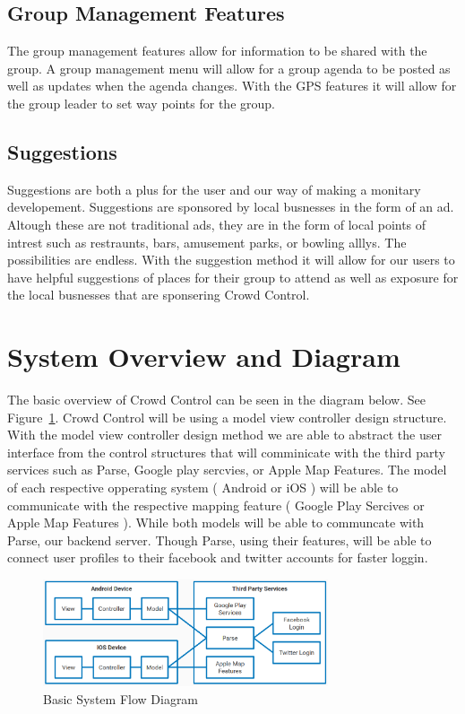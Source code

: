 \subsection{Group Management Features}
The group management features allow for information to be shared with the group. A group management menu will allow for a group agenda to be posted as well as updates when the agenda changes. With the GPS features it will allow for the group leader to set way points for the group.  

\subsection{Suggestions}
Suggestions are both a plus for the user and our way of making a monitary developement. Suggestions are sponsored by local busnesses in the form of an ad. Altough these are not traditional ads, they are in the form of local points of intrest such as restraunts, bars, amusement parks, or bowling alllys. The possibilities are endless. With the suggestion method it will allow for our users to have helpful suggestions of places for their group to attend as well as exposure for the local busnesses that are sponsering Crowd Control.


\section{System Overview and Diagram}
The basic overview of Crowd Control can be seen in the diagram below. See Figure~\ref{ModuleFlowDiagram}. Crowd Control will be using a model view controller design structure. With the model view controller design method we are able to abstract the user interface from the control structures that will comminicate with the third party services such as Parse, Google play sercvies, or Apple Map Features. The model of each respective opperating system ( Android or iOS ) will be able to communicate with the respective mapping feature ( Google Play Sercives or Apple Map Features ). While both models will be able to communcate with Parse, our backend server. Though Parse, using their features, will be able to connect user profiles to their facebook and twitter accounts for faster loggin.

\begin{figure}[tbh]
\begin{center}
\includegraphics[width=0.75\textwidth]{Additional/designpictures/ModuleFlowDiagram.png}
\end{center}
\caption{Basic System Flow Diagram \label{ModuleFlowDiagram}}
\end{figure}

